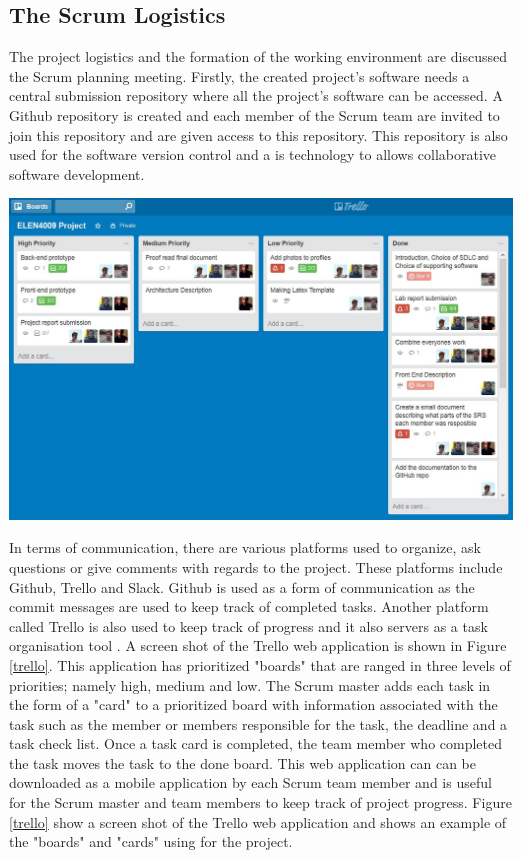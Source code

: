 \documentclass[12pt,onecolumn]{article}
\begin{document}
	\subsection{The Scrum Logistics} \label{log}
	The project logistics and the formation of the working environment are discussed the Scrum planning meeting. Firstly, the created project's software needs a central submission repository where all the project's software can be accessed. A Github repository is created and each member of the Scrum team are invited to join this repository and are given access to this repository. This repository is also used for the software version control and a is technology to allows collaborative software development.
	

	
	\begin{center}
		\includegraphics[width=\textwidth]{trello}
		 \label{fig:trello}
	\end{center}
	
	In terms of communication, there are various platforms used to organize, ask questions or give comments with regards to the project. These platforms include Github, Trello and Slack. Github is used as a form of communication as the commit messages are used to keep track of completed tasks. Another platform called Trello is also used to keep track of progress and it also servers as a task organisation tool \cite{trello}. A screen shot of the Trello web application is shown in Figure \ref{trello}. This application has prioritized "boards" that are ranged in three levels of priorities; namely high, medium and low. The Scrum master adds each task in the form of a "card" to a prioritized board with information associated with the task such as the member or members responsible for the task, the deadline and a task check list. Once a task card is completed, the team member who completed the task moves the task to the done board. This web application can can be downloaded as a mobile application by each Scrum team member and is useful for the Scrum master and team members to keep track of project progress. Figure \ref{trello} show a screen shot of the Trello web application and shows an example of the "boards" and "cards" using for the project.
	
\end{document}
